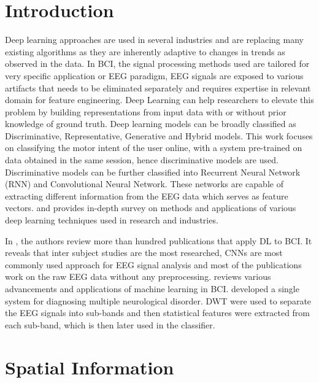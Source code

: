 \section*{Introduction}
Deep learning approaches are used in several industries and are replacing many existing algorithms as they are inherently adaptive to changes in trends as observed in the data. In BCI, the signal processing methods used are tailored for very specific application or EEG paradigm, EEG signals are exposed to various artifacts that needs to be eliminated separately and requires expertise in relevant domain for feature engineering. Deep Learning  can help researchers to elevate this problem by building representations from input data with or without prior knowledge of ground truth. Deep learning models can be broadly classified as Discriminative, Representative, Generative and Hybrid models. This work focuses on classifying the motor intent of the user online, with a system pre-trained on data obtained in the same session, hence discriminative models are used. Discriminative models can be further classified into Recurrent Neural Network (RNN) and Convolutional Neural Network. These networks are capable of extracting different information from the EEG data which serves as feature vectors. \cite{2020_Survey_DL_BCI} and \cite{2021_Book_Deep_Learning_EEG} provides in-depth survey on methods and applications of various deep learning techniques used in research and industries. 

In \cite{2019_EEG_analysis_DNN}, the authors review more than hundred publications that apply DL to BCI. It reveals that inter subject studies are the most researched, CNNs are most commonly used approach for EEG signal analysis and most of the publications work on the raw EEG data without any preprocessing. \cite{2021_ML_BCI_review} reviews various advancements and applications of machine learning in BCI. \cite{2020_EEG_WaveletTrans_ANN} developed a single system for diagnosing multiple neurological disorder. DWT were used to separate the EEG signals into sub-bands and then statistical features were extracted from each sub-band, which is then later used in the classifier.

\section{Spatial Information}

